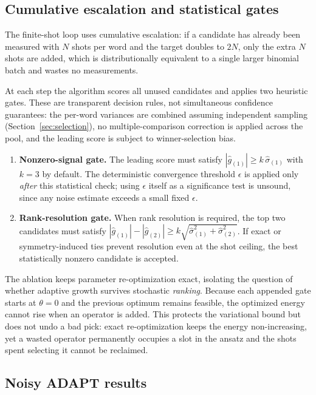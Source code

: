 \documentclass[11pt]{article}
\begin{document}
\subsection{Cumulative escalation and statistical gates}

The finite-shot loop uses cumulative escalation: if a candidate has already been measured with $N$ shots per word and the target doubles to $2N$, only the extra $N$ shots are added, which is distributionally equivalent to a single larger binomial batch and wastes no measurements.

At each step the algorithm scores all unused candidates and applies two heuristic gates.  These are transparent decision rules, not simultaneous confidence guarantees: the per-word variances are combined assuming independent sampling (Section~\ref{sec:selection}), no multiple-comparison correction is applied across the pool, and the leading score is subject to winner-selection bias.
\begin{enumerate}[leftmargin=*]
    \item \textbf{Nonzero-signal gate.}  The leading score must satisfy
    $|\widehat g_{(1)}| \ge k\,\widehat\sigma_{(1)}$ with $k=3$ by default.  The deterministic convergence threshold $\epsilon$ is applied only \emph{after} this statistical check; using $\epsilon$ itself as a significance test is unsound, since any noise estimate exceeds a small fixed $\epsilon$.
    \item \textbf{Rank-resolution gate.}  When rank resolution is required, the top two candidates must satisfy
    $|\widehat g_{(1)}|-|\widehat g_{(2)}| \ge k\sqrt{\widehat\sigma_{(1)}^2+\widehat\sigma_{(2)}^2}$.
    If exact or symmetry-induced ties prevent resolution even at the shot ceiling, the best statistically nonzero candidate is accepted.
\end{enumerate}
The ablation keeps parameter re-optimization exact, isolating the question of whether adaptive growth survives stochastic \emph{ranking}.  Because each appended gate starts at $\theta=0$ and the previous optimum remains feasible, the optimized energy cannot rise when an operator is added.  This protects the variational bound but does not undo a bad pick: exact re-optimization keeps the energy non-increasing, yet a wasted operator permanently occupies a slot in the ansatz and the shots spent selecting it cannot be reclaimed.

\subsection{Noisy ADAPT results}
\end{document}
